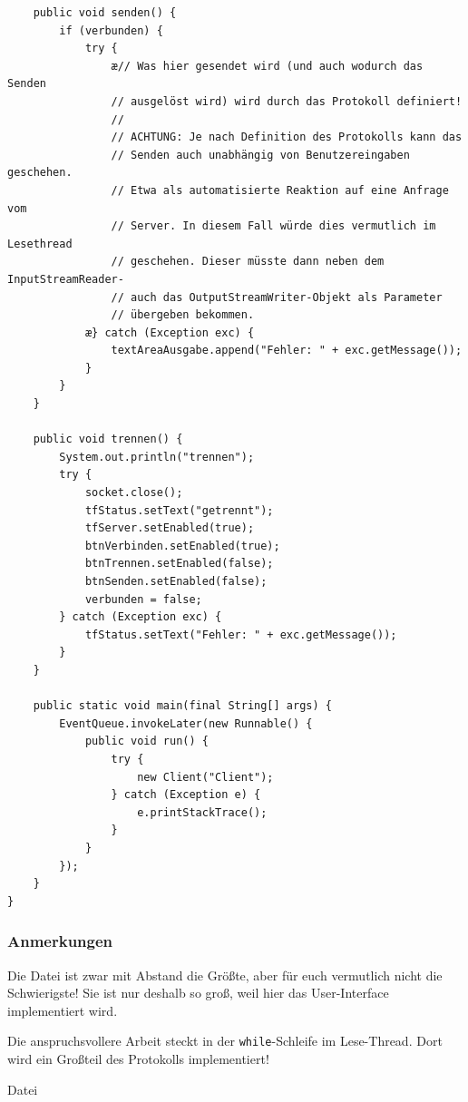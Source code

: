 \begin{lstlisting}
    public void senden() {
        if (verbunden) {
            try {
                æ// Was hier gesendet wird (und auch wodurch das Senden
                // ausgelöst wird) wird durch das Protokoll definiert!
                //
                // ACHTUNG: Je nach Definition des Protokolls kann das
                // Senden auch unabhängig von Benutzereingaben geschehen.
                // Etwa als automatisierte Reaktion auf eine Anfrage vom
                // Server. In diesem Fall würde dies vermutlich im Lesethread
                // geschehen. Dieser müsste dann neben dem InputStreamReader-
                // auch das OutputStreamWriter-Objekt als Parameter 
                // übergeben bekommen.
            æ} catch (Exception exc) {
                textAreaAusgabe.append("Fehler: " + exc.getMessage());
            }
        }
    }

    public void trennen() {
        System.out.println("trennen");
        try {
            socket.close();
            tfStatus.setText("getrennt");
            tfServer.setEnabled(true);
            btnVerbinden.setEnabled(true);
            btnTrennen.setEnabled(false);
            btnSenden.setEnabled(false);
            verbunden = false;
        } catch (Exception exc) {
            tfStatus.setText("Fehler: " + exc.getMessage());
        }
    }

    public static void main(final String[] args) {
        EventQueue.invokeLater(new Runnable() {
            public void run() {
                try {
                    new Client("Client");
                } catch (Exception e) {
                    e.printStackTrace();
                }
            }
        });
    }
}
\end{lstlisting}

\subsubsection{Anmerkungen}

Die Datei  ist zwar mit Abstand die Größte, aber für euch
vermutlich nicht die Schwierigste! Sie ist nur deshalb so groß, weil hier das
User-Interface implementiert wird.

Die anspruchsvollere Arbeit steckt in der \lstinline|while|-Schleife im
Lese-Thread. Dort wird ein Großteil des Protokolls implementiert!

Datei 


